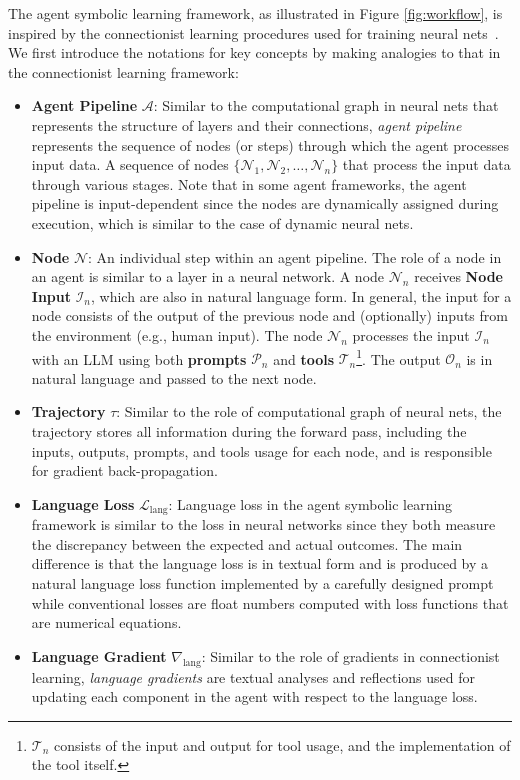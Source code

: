 \documentclass{article}
\newcommand{\Pipeline}{\mathcal{A}}
\newcommand{\Node}{\mathcal{N}}
\newcommand{\Trajectory}{\tau}
\newcommand{\LanguageLoss}{\mathcal{L}_{\text{lang}}}
\newcommand{\LanguageGradient}{\nabla_{\text{lang}}}
\newcommand{\NodeInput}{\mathcal{I}_n}
\newcommand{\NodeOutput}{\mathcal{O}_n}
\newcommand{\NodePrompt}{\mathcal{P}_n}
\newcommand{\NodeTool}{\mathcal{T}_n}
\newcommand{\baby}{agent symbolic learning\xspace}
\begin{document}
The \baby framework, as illustrated in Figure \ref{fig:workflow}, is inspired by the connectionist learning procedures used for training neural nets~\citep{hinton1990connectionist}. We first introduce the notations for key concepts by making analogies to that in the connectionist learning framework:

\begin{itemize}
    
    \item \textbf{Agent Pipeline} $\Pipeline$: Similar to the computational graph in neural nets that represents the structure of layers and their connections, \textit{agent pipeline} represents the sequence of nodes (or steps) through which the agent processes input data. A sequence of nodes $\{\Node_1, \Node_2, \ldots, \Node_n\}$ that process the input data through various stages. Note that in some agent frameworks, the agent pipeline is input-dependent since the nodes are dynamically assigned during execution, which is similar to the case of dynamic neural nets.

    \item \textbf{Node} $\Node$: An individual step within an agent pipeline. The role of a node in an agent is similar to a layer in a neural network. A node $\Node_n$ receives \textbf{Node Input} $\NodeInput$, which are also in natural language form. In general, the input for a node consists of the output of the previous node and (optionally) inputs from the environment (e.g., human input). The node $\Node_n$ processes the input $\NodeInput$ with an LLM using both \textbf{prompts} $\NodePrompt$ and \textbf{tools} $\NodeTool$\footnote{$\NodeTool$ consists of the input and output for tool usage, and the implementation of the tool itself.}. The output $\NodeOutput$ is in natural language and passed to the next node.
        
        
    \item \textbf{Trajectory} $\Trajectory$: Similar to the role of computational graph of neural nets, the trajectory stores all information during the forward pass, including the inputs, outputs, prompts, and tools usage for each node, and is responsible for gradient back-propagation.
    
    \item \textbf{Language Loss} $\LanguageLoss$: Language loss in the \baby framework is similar to the loss in neural networks since they both measure the discrepancy between the expected and actual outcomes. The main difference is that the language loss is in textual form and is produced by a natural language loss function implemented by a carefully designed prompt while conventional losses are float numbers computed with loss functions that are numerical equations. 
    
    \item \textbf{Language Gradient} $\LanguageGradient$: Similar to the role of gradients in connectionist learning, \textit{language gradients} are textual analyses and reflections used for updating each component in the agent with respect to the language loss.
\end{itemize}
\end{document}
